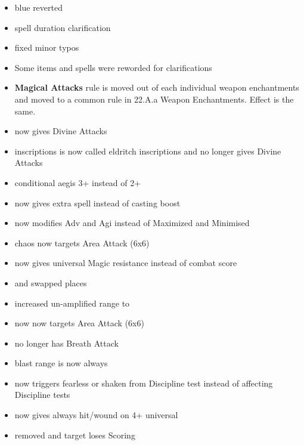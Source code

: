 
\begin{itemize}
	\item blue reverted
	\item spell duration clarification
\end{itemize}


\begin{itemize}
	\item fixed minor typos
\end{itemize}



\begin{itemize}
	\item Some items and spells were reworded for clarifications
	\item \textbf{Magical Attacks} rule is moved out of each individual weapon enchantments and moved to a common rule in 22.A.a Weapon Enchantments. Effect is the same.
	\item \cleansinglight{} now gives Divine Attacks
	\item  inscriptions is now called eldritch inscriptions and no longer gives Divine Attacks
	\item \dragonfiregem{} conditional aegis 3+ instead of 2+
	\item \bookofarcanemastery{} now gives extra spell instead of casting boost
	\item \cosmologyspelltwo{} now modifies Adv and Agi instead of Maximized and Minimised
	\item \cosmologyspellfive{} chaos now targets Area Attack (6x6)
	\item \divinationspellsix{} now gives universal Magic resistance instead of combat score
	\item \evocationspellone{} and \evocationspellfour{} swapped places
	\item \occultismspellsix{} increased un-amplified range to 
	\item \pyromancyspellsix{} now now targets Area Attack (6x6)
	\item \totemicbeastname{} no longer has Breath Attack
	\item \thaumaturgyspellfive{} blast range is now always 
	\item \thaumaturgyspellthree{} now triggers fearless or shaken from Discipline test instead of affecting Discipline tests
	\item \witchcraftspellfour{} now gives always hit/wound on 4+ universal
	\item \witchcraftspellone{} \sweepingattack{} removed and target loses Scoring
\end{itemize}

